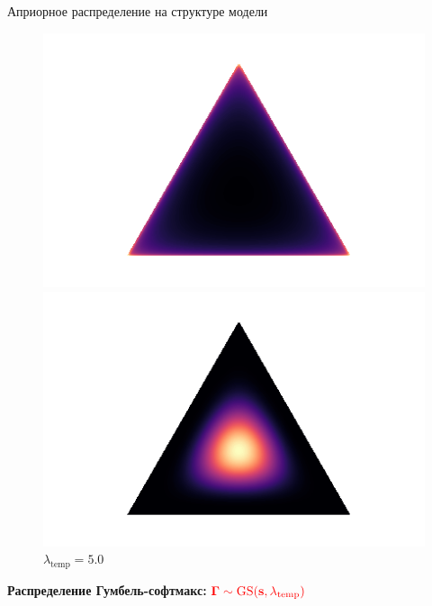 \documentclass[usenames,dvipsnames,11pt,pdf,utf8,russian,aspectratio=43]{beamer}
\begin{document}
\begin{frame}{Априорное распределение на структуре модели}
\begin{figure}
\begin{minipage}[t]{.3\textwidth}
\begin{tikzpicture}[%
x={(1.7cm,0cm)},
y={(0cm,1.7cm)},
]
\end{tikzpicture}
\caption*{$\lambda_\text{temp}\to0$}
\end{minipage}
\hfill
 \begin{minipage}[t]{.3\textwidth}
   \includegraphics[width=\textwidth]{dir0995.png}
\caption*{$\lambda_\text{temp}=0.995$}
\end{minipage}
\hfill
 \begin{minipage}[t]{.3\textwidth}
   \includegraphics[width=\textwidth]{dir5.png}
\caption*{$\lambda_\text{temp}=5.0$}
\end{minipage}

\end{figure}

\textbf{Распределение Гумбель-софтмакс: }$\textcolor{red}{\boldsymbol{\Gamma}\sim \text{GS}(\mathbf{s}, \lambda_\text{temp})}$\\
\begin{figure}
 \begin{minipage}[t]{.3\textwidth}
        \centering
\begin{tikzpicture}[%
x={(1.7cm,0cm)},
y={(0cm,1.7cm)},
]


\end{tikzpicture}
\end{minipage}
\end{figure}
\end{frame}
\end{document}
